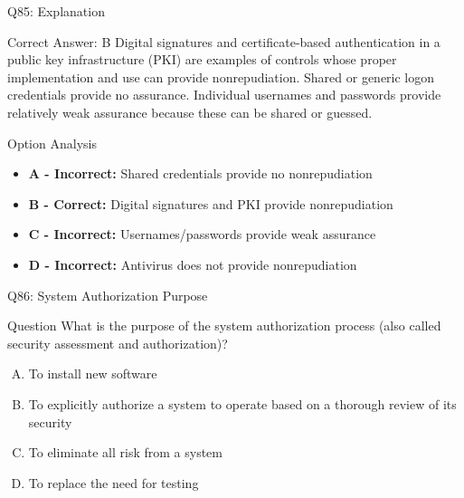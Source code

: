 \documentclass{beamer}
\begin{document}
	\begin{frame}{Q85: Explanation}
		\begin{block}{Correct Answer: B}
			Digital signatures and certificate-based authentication in a public key infrastructure (PKI) are examples of controls whose proper implementation and use can provide nonrepudiation. Shared or generic logon credentials provide no assurance. Individual usernames and passwords provide relatively weak assurance because these can be shared or guessed.
		\end{block}
		\begin{block}{Option Analysis}
			\begin{itemize}
				\item \textbf{A - Incorrect:} Shared credentials provide no nonrepudiation
				\item \textbf{B - Correct:} Digital signatures and PKI provide nonrepudiation
				\item \textbf{C - Incorrect:} Usernames/passwords provide weak assurance
				\item \textbf{D - Incorrect:} Antivirus does not provide nonrepudiation
			\end{itemize}
		\end{block}
	\end{frame}
	
	\begin{frame}{Q86: System Authorization Purpose}
		\begin{block}{Question}
			What is the purpose of the system authorization process (also called security assessment and authorization)?
		\end{block}
		\begin{enumerate}[(A)]
			\item To install new software
			\item To explicitly authorize a system to operate based on a thorough review of its security
			\item To eliminate all risk from a system
			\item To replace the need for testing
		\end{enumerate}
	\end{frame}
	
\end{document}
